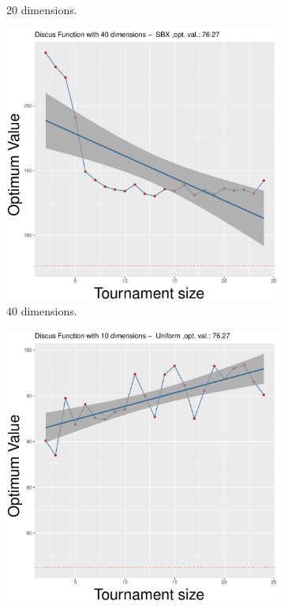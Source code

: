 \begin{figure}[!t]
\begin{subfigure}[b]{0.33\textwidth}
		\caption{20 dimensions.}
	\end{subfigure}
	\begin{subfigure}[b]{0.33\textwidth}
		\centering
		\includegraphics[width=\textwidth]{img/SBX-40D/unimodal_sbx_11_dim_40.pdf}
		\caption{40 dimensions.}
	\end{subfigure}
	\caption{SBX crossover - ($\lambda, \lambda$) scheme.}
	\label{sbx-11-a}
	\begin{subfigure}[b]{0.33\textwidth}
		\centering
		\includegraphics[width=\textwidth]{img/uniform-10D/unimodal_uniform_11_dim_10.pdf}

\end{subfigure}
\end{figure}
